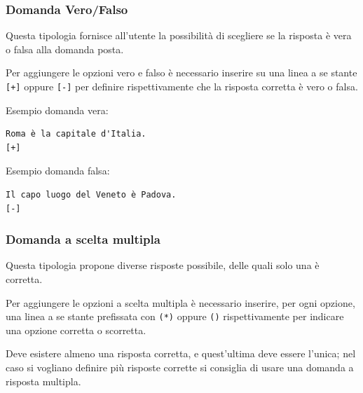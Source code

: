 \documentclass[12pt,a4paper]{article}
\begin{document}

	\subsubsection{Domanda Vero/Falso}

	\par Questa tipologia fornisce all'utente la possibilità di scegliere se la risposta è vera o falsa alla domanda posta. \\
	\par Per aggiungere le opzioni vero e falso è necessario inserire su una linea a se stante \texttt{[+]} oppure \texttt{[-]} per definire rispettivamente che la risposta corretta è vero o falsa. \\

	\par Esempio domanda vera: \\
\begin{verbatim}
Roma è la capitale d'Italia.
[+]
\end{verbatim}

	\par Esempio domanda falsa: \\
\begin{verbatim}
Il capo luogo del Veneto è Padova.
[-]
\end{verbatim}
	
\subsubsection{Domanda a scelta multipla}

\par Questa tipologia propone diverse risposte possibile, delle quali solo una è corretta. \\

\par Per aggiungere le opzioni a scelta multipla è necessario inserire, per ogni opzione, una linea a se stante prefissata con \texttt{(*)} oppure \texttt{()} rispettivamente per indicare una opzione corretta o scorretta. \\

\par Deve esistere almeno una risposta corretta, e quest'ultima deve essere l'unica; nel caso si vogliano definire più risposte corrette si consiglia di usare una domanda a risposta multipla. \\
\end{document}
